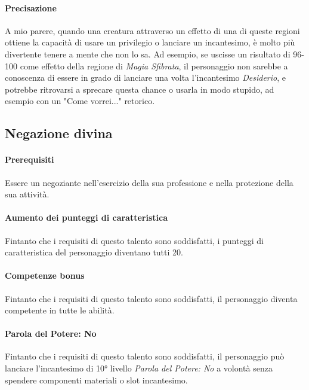 \paragraph{Precisazione} A mio parere, quando una creatura attraverso un effetto di una di queste regioni ottiene la capacità di usare un privilegio o lanciare un incantesimo, è molto più divertente tenere a mente che non lo sa. Ad esempio, se uscisse un risultato di 96-100 come effetto della regione di \textit{Magia Sfibrata}, il personaggio non sarebbe a conoscenza di essere in grado di lanciare una volta l'incantesimo \textit{Desiderio}, e potrebbe ritrovarsi a sprecare questa chance o usarla in modo stupido, ad esempio con un "Come vorrei..." retorico.

\subsection{Negazione divina}

\paragraph{Prerequisiti}Essere un negoziante nell'esercizio della sua professione e nella protezione della sua attività.
\paragraph{Aumento dei punteggi di caratteristica} Fintanto che i requisiti di questo talento sono soddisfatti, i punteggi di caratteristica del personaggio diventano tutti 20.
\paragraph{Competenze bonus}Fintanto che i requisiti di questo talento sono soddisfatti, il personaggio diventa competente in tutte le abilità.
\paragraph{Parola del Potere: No}Fintanto che i requisiti di questo talento sono soddisfatti, il personaggio può lanciare l'incantesimo di 10° livello \textit{Parola del Potere: No} a volontà senza spendere componenti materiali o slot incantesimo.